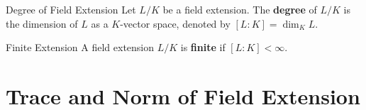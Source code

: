 \begin{definition}{Degree of Field Extension}{}
    Let $L/K$ be a field extension. The \textbf{degree} of $L/K$ is the dimension of $L$ as a $K$-vector space, denoted by $[L:K]=\dim_K L$.
\end{definition}

\begin{definition}{Finite Extension}{}
    A field extension $L/K$ is \textbf{finite} if $[L:K]<\infty$.
\end{definition}

\section{Trace and Norm of Field Extension}

